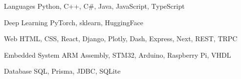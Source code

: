 

\begin{cvskills}

  \cvskill
    {Languages} %
    {Python, C++, C\#, Java, JavaScript, TypeScript} %

  \cvskill
    {Deep Learning} %
    {PyTorch, sklearn, HuggingFace} %

  \cvskill
    {Web} %
    {HTML, CSS, React, Django, Plotly, Dash, Express, Next, REST, TRPC} %

  \cvskill
    {Embedded System} %
    {ARM Assembly, STM32, Arduino, Raspberry Pi, VHDL} %

  \cvskill
    {Database} %
    {SQL, Prisma, JDBC, SQLite} %

\end{cvskills}
